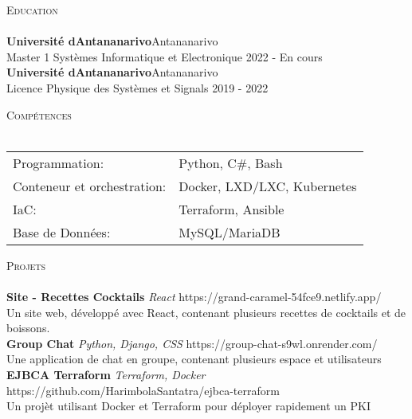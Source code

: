 \documentclass[a4paper]{article}
\newcommand{\lineunder} {
    \vspace*{-8pt} \\
    \hspace*{-18pt} \hrulefill \\
}
\newcommand{\header} [1] {
    {\hspace*{-18pt}\vspace*{6pt} \textsc{#1}}
    \vspace*{-6pt} \lineunder
}
\begin{document}
\header{Education}
\textbf{Université d\textquotesingle{}Antananarivo}\hfill Antananarivo\\
Master 1 Systèmes Informatique et Electronique \hfill 2022 - En cours\\
\vspace{2mm}
\textbf{Université d\textquotesingle{}Antananarivo}\hfill Antananarivo\\
Licence Physique des Systèmes et Signals \hfill 2019 - 2022\\
\vspace{2mm}

\header{Compétences}
\begin{tabular}{ l l }
	Programmation:              & Python, C\#, Bash           \\
	Conteneur et orchestration: & Docker, LXD/LXC, Kubernetes \\
	IaC:                        & Terraform, Ansible          \\
	Base de Données:           & MySQL/MariaDB               \\
\end{tabular}
\vspace{2mm}

\header{Projets}
{\textbf{Site - Recettes Cocktails}} {\sl React} \hfill https://grand-caramel-54fce9.netlify.app/\\
Un site web, développé avec React, contenant plusieurs recettes de cocktails et de boissons.\\
\vspace*{2mm}
{\textbf{Group Chat}} {\sl Python, Django, CSS} \hfill https://group-chat-s9wl.onrender.com/\\
Une application de chat en groupe, contenant plusieurs espace et utilisateurs\\
\vspace*{2mm}
{\textbf{EJBCA Terraform}} {\sl Terraform, Docker} \hfill https://github.com/HarimbolaSantatra/ejbca-terraform\\
Un projèt utilisant Docker et Terraform pour déployer rapidement un PKI\\
\vspace*{2mm}



\ 
\end{document}
